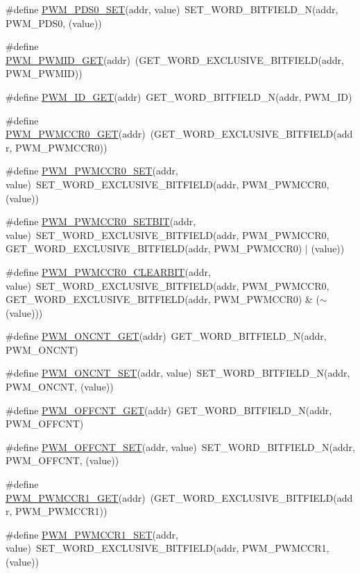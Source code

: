 \begin{DoxyCompactItemize}
\item 
\#define \hyperlink{a00564_a954404f4582c5426b22d956c49302166}{PWM\_\-PDS0\_\-SET}(addr, value)~SET\_\-WORD\_\-BITFIELD\_\-N(addr, PWM\_\-PDS0, (value))
\item 
\#define \hyperlink{a00564_ac933448d0f2ed1bf1084b2ea506b7aa8}{PWM\_\-PWMID\_\-GET}(addr)~(GET\_\-WORD\_\-EXCLUSIVE\_\-BITFIELD(addr, PWM\_\-PWMID))
\item 
\#define \hyperlink{a00564_a767fdad327b65acf06fbbfe1f06c12d1}{PWM\_\-ID\_\-GET}(addr)~GET\_\-WORD\_\-BITFIELD\_\-N(addr, PWM\_\-ID)
\item 
\#define \hyperlink{a00564_afe07d2c0427d1ec34be0ac6d9675ba3b}{PWM\_\-PWMCCR0\_\-GET}(addr)~(GET\_\-WORD\_\-EXCLUSIVE\_\-BITFIELD(addr, PWM\_\-PWMCCR0))
\item 
\#define \hyperlink{a00564_a09030af97a6e09da5fe1c0d663c4930b}{PWM\_\-PWMCCR0\_\-SET}(addr, value)~SET\_\-WORD\_\-EXCLUSIVE\_\-BITFIELD(addr, PWM\_\-PWMCCR0, (value))
\item 
\#define \hyperlink{a00564_a94a26b004f2492705496dc85791e770e}{PWM\_\-PWMCCR0\_\-SETBIT}(addr, value)~SET\_\-WORD\_\-EXCLUSIVE\_\-BITFIELD(addr, PWM\_\-PWMCCR0, GET\_\-WORD\_\-EXCLUSIVE\_\-BITFIELD(addr, PWM\_\-PWMCCR0) $|$ (value))
\item 
\#define \hyperlink{a00564_aa201d1abdea112b4f327a5cde99c16dd}{PWM\_\-PWMCCR0\_\-CLEARBIT}(addr, value)~SET\_\-WORD\_\-EXCLUSIVE\_\-BITFIELD(addr, PWM\_\-PWMCCR0, GET\_\-WORD\_\-EXCLUSIVE\_\-BITFIELD(addr, PWM\_\-PWMCCR0) \& ($\sim$(value)))
\item 
\#define \hyperlink{a00564_a2bf14b98aad5acd66236bae57022d39c}{PWM\_\-ONCNT\_\-GET}(addr)~GET\_\-WORD\_\-BITFIELD\_\-N(addr, PWM\_\-ONCNT)
\item 
\#define \hyperlink{a00564_a45b8deeab360cfc85fc20156ef08ab4f}{PWM\_\-ONCNT\_\-SET}(addr, value)~SET\_\-WORD\_\-BITFIELD\_\-N(addr, PWM\_\-ONCNT, (value))
\item 
\#define \hyperlink{a00564_af933308db9d9895acaa200900d29b412}{PWM\_\-OFFCNT\_\-GET}(addr)~GET\_\-WORD\_\-BITFIELD\_\-N(addr, PWM\_\-OFFCNT)
\item 
\#define \hyperlink{a00564_ac324e18dceb1d8cccf9e2e555d4d6cdf}{PWM\_\-OFFCNT\_\-SET}(addr, value)~SET\_\-WORD\_\-BITFIELD\_\-N(addr, PWM\_\-OFFCNT, (value))
\item 
\#define \hyperlink{a00564_ae6716c663a9aa408810909f8f5de0393}{PWM\_\-PWMCCR1\_\-GET}(addr)~(GET\_\-WORD\_\-EXCLUSIVE\_\-BITFIELD(addr, PWM\_\-PWMCCR1))
\item 
\#define \hyperlink{a00564_a876bfd2fc653def0282fbc6d35e546f5}{PWM\_\-PWMCCR1\_\-SET}(addr, value)~SET\_\-WORD\_\-EXCLUSIVE\_\-BITFIELD(addr, PWM\_\-PWMCCR1, (value))

\end{DoxyCompactItemize}
